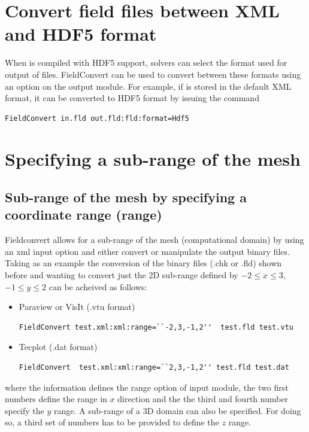 \section{Convert field files between XML and HDF5 format}
%
When \nekpp is compiled with HDF5 support, solvers can select the format used
for output of  files. FieldConvert can be used to convert between
these formats using an option on the  output module. For example, if
 is stored in the default XML format, it can be converted to HDF5
format by issuing the command
%
\begin{lstlisting}[style=BashInputStyle]
FieldConvert in.fld out.fld:fld:format=Hdf5
\end{lstlisting}
%
\section{Specifying a sub-range of the mesh}
\subsection{Sub-range of the mesh by specifying a coordinate range (range)}
Fieldconvert allows for a sub-range of the mesh (computational
domain) by using an xml input option and either convert or manipulate
the \nekpp output binary files.  Taking as an example the conversion
of the \nekpp binary files (.chk or .fld) shown before and wanting to
convert just the 2D sub-range defined by $-2\leq x \leq 3$, $-1\leq y
\leq 2$  can be acheived  as follows:
%
\begin{itemize}
\item Paraview or VisIt (.vtu format)
%
\begin{lstlisting}[style=BashInputStyle]
FieldConvert test.xml:xml:range=``-2,3,-1,2''  test.fld test.vtu
\end{lstlisting}
%
\item Tecplot (.dat format)
%
\begin{lstlisting}[style=BashInputStyle]
FieldConvert  test.xml:xml:range=``2,3,-1,2'' test.fld test.dat
\end{lstlisting}
%
\end{itemize}
where the  information defines the range option of
 input module, the two first numbers define the range in
$x$ direction and the the third and fourth number specify the $y$
range.  A sub-range of a 3D domain can also be specified.  For doing
so, a third set of numbers has to be provided to define the $z$ range.

